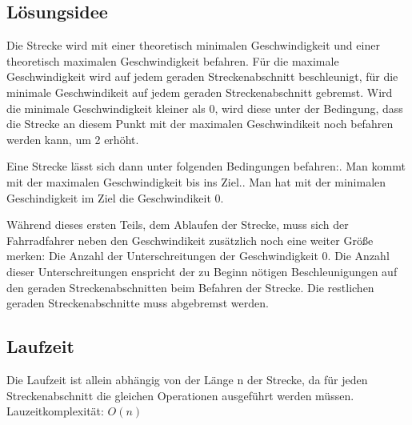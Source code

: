 \subsection {Lösungsidee}
	Die Strecke wird mit einer theoretisch minimalen Geschwindigkeit und einer theoretisch maximalen Geschwindigkeit befahren. 
	Für die maximale Geschwindigkeit wird auf jedem geraden Streckenabschnitt beschleunigt, für die minimale Geschwindikeit auf
	jedem geraden Streckenabschnitt gebremst. Wird die minimale Geschwindigkeit kleiner als 0, wird diese unter der Bedingung, 
	dass die Strecke an diesem Punkt mit der maximalen Geschwindikeit noch befahren werden kann, um 2 erhöht.
	
	Eine Strecke lässt sich dann unter folgenden Bedingungen befahren:. Man kommt mit der maximalen Geschwindigkeit bis ins Ziel.. Man hat mit der minimalen Geschindigkeit im Ziel die Geschwindikeit 0.

	Während dieses ersten Teils, dem Ablaufen der Strecke, muss sich der Fahrradfahrer neben den Geschwindikeit zusätzlich noch
	eine weiter Größe merken: Die Anzahl der Unterschreitungen der Geschwindigkeit 0. Die Anzahl dieser Unterschreitungen enspricht
	der zu Beginn nötigen Beschleunigungen auf den geraden Streckenabschnitten beim Befahren der Strecke. Die restlichen geraden Streckenabschnitte muss abgebremst werden.
\subsection{Laufzeit}
	Die Laufzeit ist allein abhängig von der Länge n der Strecke, da für jeden Streckenabschnitt die gleichen Operationen ausgeführt werden müssen. Lauzeitkomplexität: \(O(n)\)
